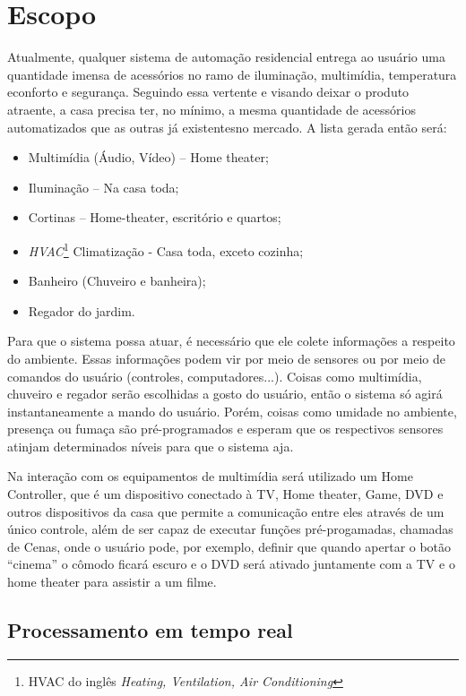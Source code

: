 \section{Escopo}

	Atualmente, qualquer sistema de automação residencial entrega ao usuário uma quantidade imensa de acessórios no ramo de iluminação, multimídia, temperatura econforto e segurança\cite{2009Montgomery}. Seguindo essa vertente e visando deixar o produto atraente, a casa precisa ter, no mínimo, a mesma quantidade de acessórios automatizados que as outras já existentesno mercado. A lista gerada então será:

\begin{itemize}
	\item Multimídia (Áudio, Vídeo) – Home theater;
	\item Iluminação – Na casa toda;
	\item Cortinas – Home-theater, escritório e quartos;
	\item \textit{HVAC}\footnote{HVAC do inglês \textit{Heating, Ventilation, Air Conditioning}} Climatização - Casa toda, exceto cozinha;
	\item Banheiro (Chuveiro e banheira);
	\item Regador do jardim.
\end{itemize}

	Para que o sistema possa atuar, é necessário que ele colete informações a respeito do ambiente. Essas informações podem vir por meio de sensores ou por meio de comandos do usuário (controles, computadores...). Coisas como multimídia, chuveiro e regador serão escolhidas a gosto do usuário, então o sistema só agirá instantaneamente a mando do usuário. Porém, coisas como umidade no ambiente, presença ou fumaça são pré-programados e esperam que os respectivos sensores atinjam determinados níveis para que o sistema aja.

	Na interação com os equipamentos de multimídia será utilizado um Home Controller, que é um dispositivo conectado à TV, Home theater, Game, DVD e outros dispositivos da casa que permite a comunicação entre eles através de um único controle, além de ser capaz de executar funções pré-progamadas, chamadas de Cenas, onde o usuário pode, por exemplo, definir que quando apertar o botão “cinema” o cômodo ficará escuro e o DVD será ativado juntamente com a TV e o home theater para assistir a um filme.

\subsection{Processamento em tempo real}

